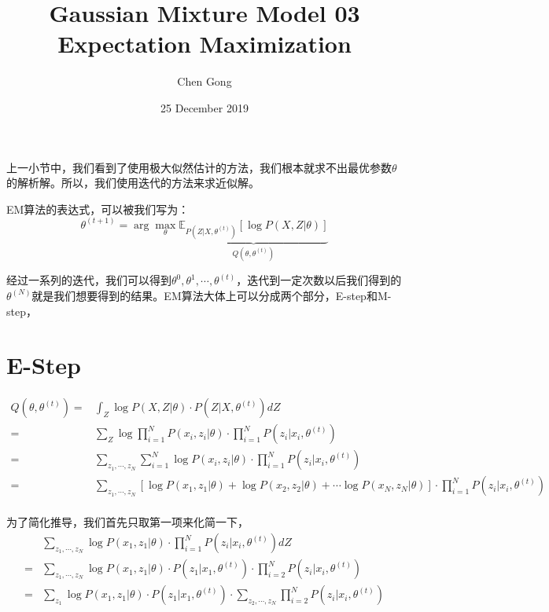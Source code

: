 \documentclass[a4paper]{article}
\title{Gaussian Mixture Model 03 Expectation Maximization}
\author{Chen Gong}
\date{25 December 2019}
\begin{document}
\maketitle
上一小节中，我们看到了使用极大似然估计的方法，我们根本就求不出最优参数$\theta$的解析解。所以，我们使用迭代的方法来求近似解。

EM算法的表达式，可以被我们写为：
\begin{equation}
    \theta^{(t+1)} = \arg\max_\theta \underbrace{\mathbb{E}_{P(Z|X,\theta^{(t)})} \left[ \log P(X,Z|\theta) \right]}_{Q(\theta,\theta^{(t)})}
\end{equation}

经过一系列的迭代，我们可以得到$\theta^{0},\theta^{1},\cdots,\theta^{(t)}$，迭代到一定次数以后我们得到的$\theta^{(N)}$就是我们想要得到的结果。EM算法大体上可以分成两个部分，E-step和M-step，

\section{E-Step}
\begin{equation}
    \begin{split}
        Q(\theta,\theta^{(t)}) 
        = & \int_Z \log P(X,Z|\theta)\cdot P(Z|X,\theta^{(t)}) dZ \\
        = & \sum_Z \log \prod_{i=1}^N P(x_i,z_i|\theta)\cdot \prod_{i=1}^N P(z_i|x_i,\theta^{(t)}) \\
        = & \sum_{z_1,\cdots,z_N} \sum_{i=1}^N \log P(x_i,z_i|\theta)\cdot \prod_{i=1}^N P(z_i|x_i,\theta^{(t)}) \\
        = & \sum_{z_1,\cdots,z_N} \left[ \log P(x_1,z_1|\theta) + \log P(x_2,z_2|\theta) + \cdots \log P(x_N,z_N|\theta) \right] \cdot \prod_{i=1}^N P(z_i|x_i,\theta^{(t)}) \\
    \end{split}
\end{equation}

为了简化推导，我们首先只取第一项来化简一下，
\begin{equation}
    \begin{split}
        & \sum_{z_1,\cdots,z_N} \log P(x_1,z_1|\theta) \cdot \prod_{i=1}^N P(z_i|x_i,\theta^{(t)}) dZ \\
        = & \sum_{z_1,\cdots,z_N} \log P(x_1,z_1|\theta) \cdot P(z_1|x_1,\theta^{(t)}) \cdot \prod_{i=2}^N P(z_i|x_i,\theta^{(t)})\\
        = & \sum_{z_1} \log P(x_1,z_1|\theta) \cdot  P(z_1|x_1,\theta^{(t)}) \cdot \sum_{z_2,\cdots,z_N} \prod_{i=2}^N P(z_i|x_i,\theta^{(t)})\\
    \end{split}
\end{equation}
\end{document}
